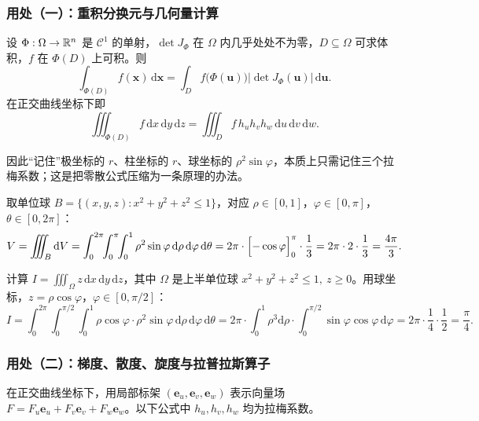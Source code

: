 \subsubsection{用处（一）：重积分换元与几何量计算}

\begin{theorem}[重积分换元公式]
设 \(\Phi:\Omega\to\mathbb{R}^n\) 是 \(\mathcal C^1\) 的单射，\(\det J_\Phi\) 在 \(\Omega\) 内几乎处处不为零，\(D\subseteq\Omega\) 可求体积，\(f\) 在 \(\Phi(D)\) 上可积。则
\[
\int_{\Phi(D)}f(\mathbf{x})\,\mathrm{d}\mathbf{x}
=\int_D f\bigl(\Phi(\mathbf{u})\bigr)\left|\det J_\Phi(\mathbf{u})\right|\,\mathrm{d}\mathbf{u}.
\]
在正交曲线坐标下即
\[
\iiint_{\Phi(D)} f\,\mathrm{d}x\,\mathrm{d}y\,\mathrm{d}z
=\iiint_{D} f\,h_uh_vh_w\,\mathrm{d}u\,\mathrm{d}v\,\mathrm{d}w .
\]
\end{theorem}

因此“记住”极坐标的 \(r\)、柱坐标的 \(r\)、球坐标的 \(\rho^2\sin\varphi\)，本质上只需记住三个拉梅系数；这是把零散公式压缩为一条原理的办法。

\begin{example}[用球坐标计算球体体积]
取单位球 \(B=\{(x,y,z):x^2+y^2+z^2\le1\}\)，对应 \(\rho\in[0,1]\)，\(\varphi\in[0,\pi]\)，\(\theta\in[0,2\pi]\)：
\[
V=\iiint_B\mathrm{d}V=\int_0^{2\pi}\!\!\int_0^{\pi}\!\!\int_0^{1}\rho^2\sin\varphi\,\mathrm{d}\rho\,\mathrm{d}\varphi\,\mathrm{d}\theta
=2\pi\cdot\Bigl[-\cos\varphi\Bigr]_0^{\pi}\cdot\frac13
=2\pi\cdot2\cdot\frac13=\frac{4\pi}{3}.
\]
\end{example}

\begin{example}[球面上方的积分]
计算 \(I=\displaystyle\iiint_{\Omega} z\,\mathrm{d}x\,\mathrm{d}y\,\mathrm{d}z\)，其中 \(\Omega\) 是上半单位球 \(x^2+y^2+z^2\le1,\ z\ge0\)。用球坐标，\(z=\rho\cos\varphi\)，\(\varphi\in[0,\pi/2]\)：
\[
I=\int_0^{2\pi}\!\!\int_0^{\pi/2}\!\!\int_0^1 \rho\cos\varphi\cdot\rho^2\sin\varphi\,\mathrm{d}\rho\,\mathrm{d}\varphi\,\mathrm{d}\theta
=2\pi\cdot\int_0^1\rho^3\mathrm{d}\rho\cdot\int_0^{\pi/2}\sin\varphi\cos\varphi\,\mathrm{d}\varphi
=2\pi\cdot\frac14\cdot\frac12=\frac{\pi}{4}.
\]
\end{example}

\subsubsection{用处（二）：梯度、散度、旋度与拉普拉斯算子}

在正交曲线坐标下，用局部标架 \((\mathbf e_u,\mathbf e_v,\mathbf e_w)\) 表示向量场 \(F=F_u\mathbf e_u+F_v\mathbf e_v+F_w\mathbf e_w\)。以下公式中 \(h_u,h_v,h_w\) 均为拉梅系数。

